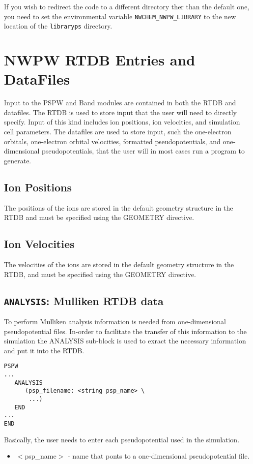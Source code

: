 If you wish to redirect the code to a different directory ther than
the default one, 
you need to set the environmental variable
{\tt NWCHEM\_NWPW\_LIBRARY}
to the new location of the \verb+libraryps+ directory.



\section{NWPW RTDB Entries and DataFiles}
\label{sec:pspw_data}
Input to the PSPW and Band modules are contained in both the RTDB and datafiles.
The RTDB is used to store input that the user will need to directly specify.
Input of this kind includes ion positions, ion velocities, and simulation cell
parameters.  The datafiles are used to store input, such the one-electron 
orbitals, one-electron orbital velocities, formatted pseudopotentials, 
and one-dimensional pseudopotentials, that the user will in most cases
run a program to generate.

\subsection{Ion Positions}
The positions of the ions are stored in the default geometry structure
in the RTDB and must be specified  using the GEOMETRY directive.

\subsection{Ion Velocities}
The velocities of the ions are stored in the default geometry structure
in the RTDB, and must be specified using the GEOMETRY directive.


\subsection{{\tt ANALYSIS}: Mulliken RTDB data}
\label{sec:pspw_analysis}

To perform Mulliken analysis information is needed from one-dimensional
pseudopotential files.  In-order to facilitate the transfer of this information
to the simulation the ANALYSIS sub-block is used to exract the necessary information
and put it into the RTDB.
\begin{verbatim}
PSPW
...
   ANALYSIS
      (psp_filename: <string psp_name> \
       ...)
   END
...
END
\end{verbatim}
Basically, the user needs to enter each pseudopotential used in the simulation.
\begin{itemize}
        \item $<$psp\_name$>$ - name that ponts to a one-dimensional pseudopotential file.
\end{itemize}


